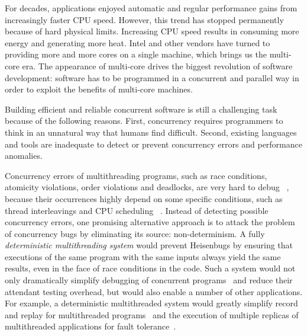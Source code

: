 For decades, applications enjoyed automatic and regular performance gains from increasingly faster CPU speed.  However, this trend has stopped permanently because of hard physical limits. Increasing CPU speed results in consuming more energy and generating more heat. Intel and other vendors have turned to providing more and more cores on a single machine, which brings us the multi-core era. The appearance of multi-core drives the biggest revolution of software development: software has to be programmed in a concurrent and parallel way in order to exploit the benefits of multi-core machines.

Building efficient and reliable concurrent software is still a challenging task because of the following reasons. First, concurrency requires programmers to think in an unnatural way that humans find difficult.  Second, existing languages and tools are inadequate to detect or prevent concurrency errors and performance anomalies. 

Concurrency errors of multithreading programs, such as race conditions, atomicity violations, order violations and deadlocks, are very hard to debug ~\cite{Lu:2008:LMC:1346281.1346323}, because their occurrences highly depend on some specific conditions, such as thread interleavings and CPU scheduling ~\cite{DBLP:conf/icse/BallBHMQ09,DBLP:conf/asplos/BurckhardtKMN10}. Instead of detecting possible concurrency errors, one promising alternative approach is to attack the problem of concurrency bugs by eliminating its source: non-determinism. A fully \emph{deterministic multithreading system} would prevent Heisenbugs by ensuring that executions of the same program with the same inputs always yield the same results, even in the face of race conditions in the code. Such a system would not only dramatically simplify debugging of concurrent
programs~\cite{Carver:1991:RTC:624586.625040} and reduce their attendant testing overhead, but would also enable a number of other applications. For example, a deterministic multithreaded system would greatly simplify record and replay for multithreaded programs~\cite{Choi:1998:DRJ:281035.281041,LeBlanc:1987:DPP:32387.32396} and the execution of multiple replicas of multithreaded applications for fault tolerance~\cite{deterministic-process-groups,1134000,224058,replicant-hotos}.

